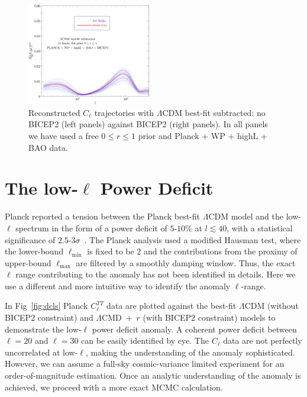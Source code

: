 \documentclass[11pt]{article}
\def \halffigwidth{0.48\textwidth}
\begin{document}
\begin{figure}
\includegraphics[width = \halffigwidth]{spline0_p11_dclBB_trajs.pdf}
\caption{Reconstructed $C_\ell$ trajectories with $\Lambda$CDM best-fit subtracted: no BICEP2 (left panels) against BICEP2 (right panels). In all panels we have used a free $0\le r\le 1$ prior and Planck + WP + highL + BAO data.  \label{fig:traj_cltt}}
\end{figure}

\section{The low-$\ell$ Power Deficit \label{sec:anomaly}}

Planck reported a tension between the Planck best-fit $\Lambda$CDM model and the low-$\ell$ spectrum in the form of a power deficit of $5$-$10$\% at $l\lesssim 40$, with a statistical significance of $2.5$-$3\sigma$~\cite{Planck2013PowerSpectra}. The Planck analysis used a modified Hausman test, where the lower-bound $\ell_{\min}$ is fixed to be $2$ and the contributions from the proximy of upper-bound $\ell_{\max}$ are filtered by a smoothly damping window. Thus, the exact $\ell$ range contributing to the anomaly has not been identified in details. Here we use a different and more intuitive way to identify the anomaly $\ell$-range.


In Fig~\ref{fig:dcls} Planck $C_\ell^{TT}$ data are plotted against the best-fit $\Lambda$CDM (without BICEP2 constraint) and $\Lambda$CMD~+~$r$ (with BICEP2 constraint) models to demonstrate the low-$\ell$ power deficit anomaly. A coherent power deficit between $\ell=20$ and $\ell = 30$ can be easily identified by eye. The $C_{\ell}$ data are not perfectly uncorrelated at low-$\ell$, making the understanding of the anomaly sophisticated. However, we can assume a full-sky cosmic-variance limited experiment for an order-of-magnitude estimation. Once an analytic understanding of the anomaly is achieved, we proceed with a more exact MCMC calculation.
\end{document}
